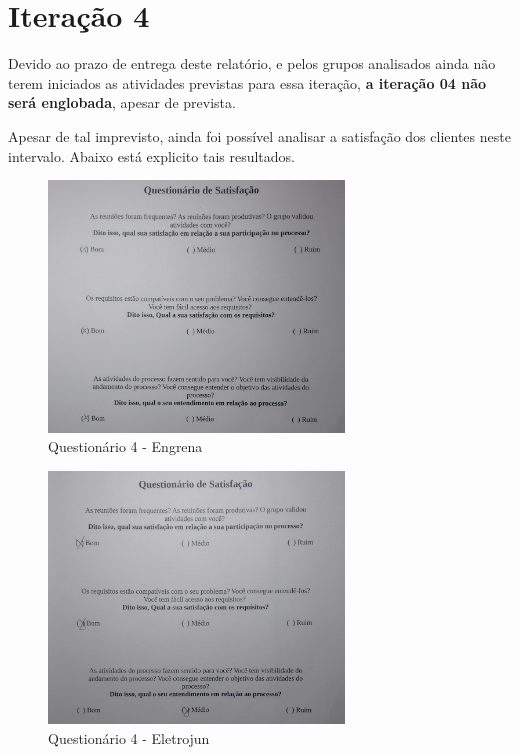 \section{Iteração 4}

Devido ao prazo de entrega deste relatório, e pelos grupos analisados 
ainda não terem iniciados as atividades previstas para essa iteração, 
\textbf{a iteração 04 não será englobada}, apesar de prevista.

Apesar de tal imprevisto, ainda foi possível analisar a satisfação dos clientes neste intervalo. Abaixo está explicito tais resultados.

\begin{figure}[H]
  \center
  \includegraphics[width=0.7\textwidth]{figuras/quest7}
  \caption{Questionário 4 - Engrena}
  \label{fig:quest7}
\end{figure}

\begin{figure}[H]
  \center
  \includegraphics[width=0.7\textwidth]{figuras/quest8}
  \caption{Questionário 4 - Eletrojun}
  \label{fig:quest8}
\end{figure}



